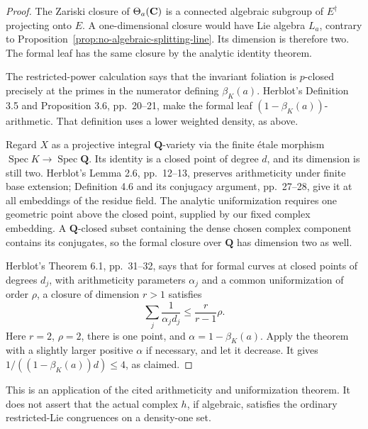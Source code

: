 \documentclass[11pt]{article}
\theoremstyle{definition}\newtheorem{definition}[theorem]{Definition}
\theoremstyle{remark}\newtheorem{remark}[theorem]{Remark}
\newcommand{\Q}{\mathbf Q}\newcommand{\Z}{\mathbf Z}
\DeclareMathOperator{\Spec}{Spec}\DeclareMathOperator{\Res}{Res}
\begin{document}
\begin{proof}
The Zariski closure of $\Theta_a(\mathbf C)$ is a connected algebraic subgroup of $E^\dagger$ projecting onto $E$. A one-dimensional closure would have Lie algebra $L_a$, contrary to Proposition~\ref{prop:no-algebraic-splitting-line}. Its dimension is therefore two. The formal leaf has the same closure by the analytic identity theorem.

The restricted-power calculation says that the invariant foliation is $p$-closed precisely at the primes in the numerator defining $\beta_K(a)$. Herblot's Definition 3.5 and Proposition 3.6, pp.~20--21, make the formal leaf $(1-\beta_K(a))$-arithmetic. That definition uses a lower weighted density, as above.

Regard $X$ as a projective integral $\Q$-variety via the finite \'etale morphism $\Spec K\to\Spec\Q$. Its identity is a closed point of degree $d$, and its dimension is still two. Herblot's Lemma 2.6, pp.~12--13, preserves arithmeticity under finite base extension; Definition 4.6 and its conjugacy argument, pp.~27--28, give it at all embeddings of the residue field. The analytic uniformization requires one geometric point above the closed point, supplied by our fixed complex embedding. A $\Q$-closed subset containing the dense chosen complex component contains its conjugates, so the formal closure over $\Q$ has dimension two as well.

Herblot's Theorem 6.1, pp.~31--32, says that for formal curves at closed points of degrees $d_j$, with arithmeticity parameters $\alpha_j$ and a common uniformization of order $\rho$, a closure of dimension $r>1$ satisfies
\[
                    \sum_j\frac1{\alpha_jd_j}
                       \le\frac r{r-1}\rho.
\]
Here $r=2$, $\rho=2$, there is one point, and $\alpha=1-\beta_K(a)$. Apply the theorem with a slightly larger positive $\alpha$ if necessary, and let it decrease. It gives $1/((1-\beta_K(a))d)\le4$, as claimed.
\end{proof}

This is an application of the cited arithmeticity and uniformization theorem. It does not assert that the actual complex $h$, if algebraic, satisfies the ordinary restricted-Lie congruences on a density-one set.
\end{document}
